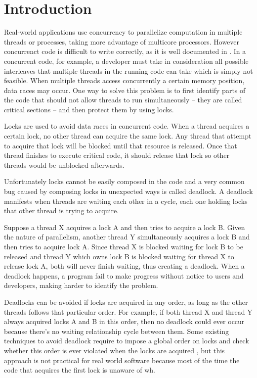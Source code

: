 \section{Introduction}

Real-world applications use concurrency to parallelize computation in multiple threads or processes, taking more advantage of multicore processors.
However concurrenct code is difficult to write correctly, as it is well documented in \cite{lu}. In a concurrent code, for example, a developer must
take in consideration all possible interleaves that multiple threads in the running code can take which is simply not feasible.
When multiple threads access concurrently a certain memory position, data races may occur.
One way to solve this problem is to first identify parts of the code that should not allow threads to run simultaneously -- they are
called critical sections -- and then protect them by using locks. 

Locks are used to avoid data races in concurrent code. When a thread acquires a certain lock, no other thread can acquire the same lock.
Any thread that attempt to acquire that lock will be blocked until that resource is released. Once that thread finishes to execute critical code,
it should release that lock so other threads would be unblocked afterwards.

Unfortunately locks cannot be easily composed in the code and a very common bug caused by composing locks in unexpected ways is called deadlock.
A deadlock manifests when threads are waiting each other in a cycle, each one holding locks that other thread is trying to acquire.

Suppose a thread X acquires a lock A and then tries to acquire a lock B. Given the nature of parallelism, another thread Y simultaneously acquires
a lock B and then tries to acquire lock A. Since thread X is blocked waiting for lock B to be released and thread Y which owns lock B is blocked
waiting for thread X to release lock A, both will never finish waiting, thus creating a deadlock. When a deadlock happens, a program fail
to make progress without notice to users and developers, making harder to identify the problem.

Deadlocks can be avoided if locks are acquired in any order, as long as the other threads follows that particular order. For example, if both thread X
and thread Y always acquired locks A and B in this order, then no deadlock could ever occur because there's no waiting relationship cycle between them. 
Some existing techniques to avoid deadlock require to impose a global order on locks and check whether this order is ever violated when the locks are acquired \cite{marino},
but this approach is not practical for real world software because most of the time the code that acquires the first lock is unaware of wh.

